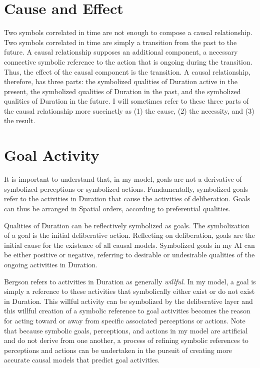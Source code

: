 \section{Cause and Effect}

Two symbols correlated in time are not enough to compose a causal
relationship.  Two symbols correlated in time are simply a transition
from the past to the future.  A causal relationship supposes an
additional component, a necessary connective symbolic reference to the
action that is ongoing during the transition.  Thus, the effect of the
causal component is the transition.  A causal relationship, therefore,
has three parts: the symbolized qualities of Duration active in the
present, the symbolized qualities of Duration in the past, and the
symbolized qualities of Duration in the future.  I will sometimes
refer to these three parts of the causal relationship more succinctly
as (1) the cause, (2) the necessity, and (3) the result.

\section{Goal Activity}

It is important to understand that, in my model, goals are not a
derivative of symbolized perceptions or symbolized actions.
Fundamentally, symbolized goals refer to the activities in Duration
that cause the activities of deliberation.  Goals can thus be arranged
in Spatial orders, according to preferential qualities.

Qualities of Duration can be reflectively symbolized as goals.  The
symbolization of a goal is the initial deliberative action.
Reflecting on deliberation, goals are the initial cause for the
existence of all causal models.  Symbolized goals in my AI can be
either positive or negative, referring to desirable or undesirable
qualities of the ongoing activities in Duration.

Bergson refers to activities in Duration as generally \emph{willful}.
In my model, a goal is simply a reference to these activities that
symbolically either exist or do not exist in Duration.  This willful
activity can be symbolized by the deliberative layer and this willful
creation of a symbolic reference to goal activities becomes the reason
for acting toward or away from specific associated perceptions or
actions.  Note that because symbolic goals, perceptions, and actions
in my model are artificial and do not derive from one another, a
process of refining symbolic references to perceptions and actions can
be undertaken in the pursuit of creating more accurate causal models
that predict goal activities.

